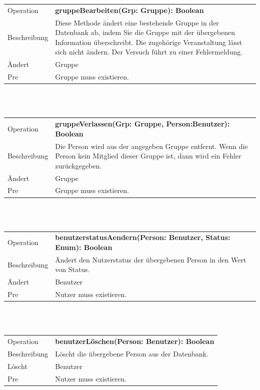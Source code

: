 \documentclass[12pt,a4paper]{article}
\begin{document}
{\begin{tabular}{|l|p{12cm}|}
	\hline
	Operation & \textbf{ gruppeBearbeiten(Grp: Gruppe): Boolean} \\ 
	Beschreibung & Diese Methode ändert eine bestehende Gruppe in der Datenbank ab, indem Sie die Gruppe mit der übergebenen Information überschreibt. Die zugehörige Veranstaltung lässt sich nicht ändern. Der Versuch führt zu einer Fehlermeldung.\\ 
	Ändert & Gruppe \\ 
	Pre & Gruppe muss existieren. \\ 
	\hline 
\end{tabular} \\\\

\begin{tabular}{|l|p{12cm}|}
	\hline
	Operation &  \textbf{gruppeVerlassen(Grp: Gruppe, Person:Benutzer): Boolean }\\ 
	Beschreibung & Die Person wird aus der angegeben Gruppe entfernt. Wenn die Person kein Mitglied dieser Gruppe ist, dann wird ein Fehler zurückgegeben.\\ 
	Ändert & Gruppe \\ 
	Pre & Gruppe muss existieren. \\ 
	\hline 
\end{tabular} \\\\

\begin{tabular}{|l|p{12cm}|}
	\hline
	Operation &  \textbf{benutzerstatusAendern(Person: Benutzer, Status: Enum): Boolean} \\ 
	Beschreibung & Ändert den Nutzerstatus der übergebenen Person in den Wert von \glqq Status\grqq. \\ 
	Ändert & Benutzer \\ 
	Pre & Nutzer muss existieren. \\ 
	\hline 
\end{tabular} \\\\

\begin{tabular}{|l|p{12cm}|}
	\hline
	Operation &  \textbf{benutzerLöschen(Person: Benutzer): Boolean }\\ 
	Beschreibung & Löscht die übergebene Person aus der Datenbank. \\ 
	Löscht & Benutzer \\ 
	Pre &  Nutzer muss existieren. \\ 
	\hline 
\end{tabular} \\\\

}
\end{document}
